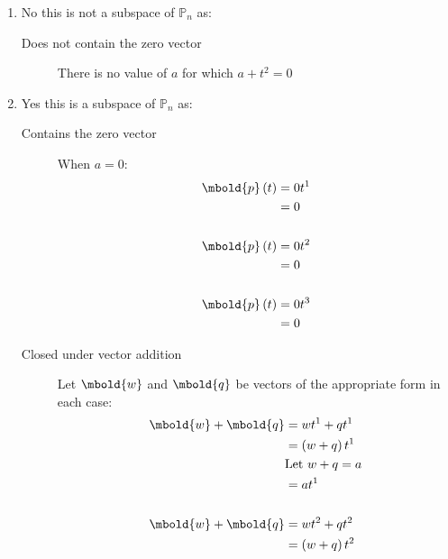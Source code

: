 \documentclass[12pt letter]{report}
\begin{document}
{\begin{enumerate}
\begin{description}
          \end{description}
    \item No this is not a subspace of $\mathbb{P}_n$ as:
          \begin{description}
            \item[Does not contain the zero vector] There is no value of $a$ for which $a + t^2 = 0$
          \end{description}
    \item Yes this is a subspace of $\mathbb{P}_n$ as:
          \begin{description}
            \item[Contains the zero vector]  When $a = 0$:
                  \begin{align*}
                    \mbold{p} \left( t \right) & = 0 t^{1} \\
                                               & = 0       \\
                    \\
                    \mbold{p} \left( t \right) & = 0 t^{2} \\
                                               & = 0       \\
                    \\
                    \mbold{p} \left( t \right) & = 0 t^{3} \\
                                               & = 0       \\
                  \end{align*}
            \item[Closed under vector addition] Let $\mbold{w}$ and $\mbold{q}$ be vectors of the appropriate form in
                  each case:
                  \begin{align*}
                    \mbold{w} + \mbold{q} & = wt^{1} + qt ^{1}           \\
                                          & = \left( w + q \right)t ^{1} \\
                                          & \text{Let $w + q = a$}       \\
                                          & = a t ^{1}                   \\
                    \\
                    \mbold{w} + \mbold{q} & = wt^{2} + qt ^{2}           \\
                                          & = \left( w + q \right)t ^{2} \\

\end{align*}
\end{description}
\end{enumerate}}
\end{document}
